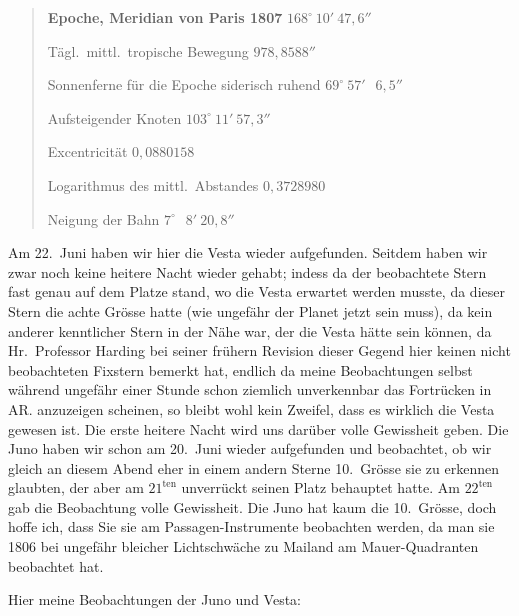 \documentclass[12pt,a4paper]{book}
\begin{document}
\begin{quote}
\textbf{Epoche, Meridian von Paris 1807} \dotfill $168^{\circ}\ 10'\ 47{,}6''$

T\"agl.~mittl.~tropische Bewegung \dotfill $978{,}8588''$

Sonnenferne f\"ur die Epoche siderisch ruhend \dotfill $69^{\circ}\ 57'\ \phantom{0}6{,}5''$

Aufsteigender Knoten \dotfill $103^{\circ}\ 11'\ 57{,}3''$

Excentricit\"at \dotfill $0{,}0880158$

Logarithmus des mittl.~Abstandes \dotfill $0{,}3728980$

Neigung der Bahn \dotfill $7^{\circ}\ \phantom{0}8'\ 20{,}8''$
\end{quote}

Am 22.~Juni haben wir hier die Vesta wieder aufgefunden. Seitdem haben wir zwar noch keine heitere Nacht wieder gehabt; indess da der beobachtete Stern fast genau auf dem Platze stand, wo die Vesta erwartet werden musste, da dieser Stern die achte Gr\"osse hatte (wie ungef\"ahr der Planet jetzt sein muss), da kein anderer kenntlicher Stern in der N\"ahe war, der die Vesta h\"atte sein k\"onnen, da Hr.~Professor Harding bei seiner fr\"uhern Revision dieser Gegend hier keinen nicht beobachteten Fixstern bemerkt hat, endlich da meine Beobachtungen selbst w\"ahrend ungef\"ahr einer Stunde schon ziemlich unverkennbar das Fortr\"ucken in AR. anzuzeigen scheinen, so bleibt wohl kein Zweifel, dass es wirklich die Vesta gewesen ist. Die erste heitere Nacht wird uns dar\"uber volle Gewissheit geben. Die Juno haben wir schon am 20.~Juni wieder aufgefunden und beobachtet, ob wir gleich an diesem Abend eher in einem andern Sterne 10.~Gr\"osse sie zu erkennen glaubten, der aber am $21^{\text{ten}}$ unverr\"uckt seinen Platz behauptet hatte. Am $22^{\text{ten}}$ gab die Beobachtung volle Gewissheit. Die Juno hat kaum die 10.~Gr\"osse, doch hoffe ich, dass Sie sie am Passagen-Instrumente beobachten werden, da man sie 1806 bei ungef\"ahr bleicher Lichtschw\"ache zu Mailand am Mauer-Quadranten beobachtet hat.

Hier meine Beobachtungen der Juno und Vesta:
\end{document}
